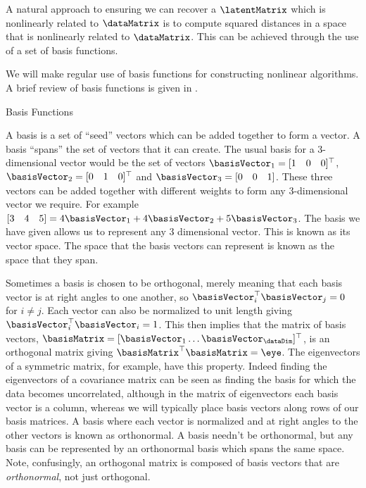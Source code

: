 A natural approach to ensuring we can recover a $\latentMatrix$ which
is nonlinearly related to $\dataMatrix$ is to compute squared
distances in a space that is nonlinearly related to
$\dataMatrix$. This can be achieved through the use of a set of basis
functions.

We will make regular use of basis functions for constructing nonlinear
algorithms. A brief review of basis functions is given in
.
\begin{boxfloat}
  \caption{Basis Functions}\label{box:basisFunctions}
  A basis is a set of ``seed'' vectors which can be added together to
  form a vector. A basis ``spans'' the set of vectors that it can
  create. The usual basis for a 3-dimensional vector would be the set
  of vectors $\basisVector_{1}=[1\quad 0\quad0]^\top$,
  $\basisVector_{2}=[0\quad 1\quad0]^\top$ and
  $\basisVector_{3}=[0\quad 0\quad 1]$. These three vectors can be
  added together with different weights to form any 3-dimensional
  vector we require. For example $[3\quad 4\quad 5]=4\basisVector_1 +
  4\basisVector_2 + 5\basisVector_3$. The basis we have given allows
  us to represent any 3 dimensional vector. This is known as its
  vector space. The space that the basis vectors can represent is
  known as the space that they span.

  Sometimes a basis is chosen to be orthogonal, merely meaning that
  each basis vector is at right angles to one another, so
  $\basisVector_{i}^\top\basisVector_j=0$ for $i\neq j$. Each vector
  can also be normalized to unit length giving
  $\basisVector_i^\top\basisVector_i=1$. This then implies that the
  matrix of basis vectors,
  $\basisMatrix=[\basisVector_1\dots\basisVector_\dataDim]^\top$, is
  an orthogonal matrix giving $\basisMatrix^\top\basisMatrix
  =\eye$. The eigenvectors of a symmetric matrix, for example, have
  this property. Indeed finding the eigenvectors of a covariance
  matrix can be seen as finding the basis for which the data becomes
  uncorrelated, although in the matrix of eigenvectors each basis
  vector is a column, whereas we will typically place basis vectors
  along rows of our basis matrices. A basis where each vector is
  normalized and at right angles to the other vectors is known as
  orthonormal.  A basis needn't be orthonormal, but any basis can be
  represented by an orthonormal basis which spans the same
  space. Note, confusingly, an orthogonal matrix is composed of basis
  vectors that are \emph{orthonormal}, not just orthogonal.



\end{boxfloat}
